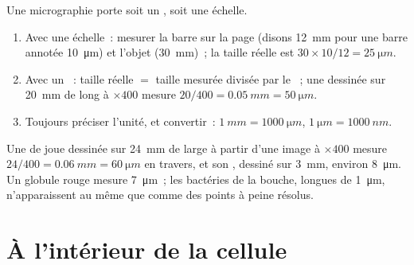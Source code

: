 \begin{method}\label{met:g10:cells-common-unit:measure}
Une micrographie porte soit un , soit une échelle.
\begin{enumerate}
  \item Avec une échelle~: mesurer la barre sur la page (disons
        \qty{12}{mm} pour une barre annotée \qty{10}{\micro m}) et
        l'objet (\qty{30}{mm})~; la taille réelle est $30 \times 10/12 =
        \qty{25}{\micro m}$.
  \item Avec un ~: taille réelle $=$ taille mesurée
        divisée par le ~; une  dessinée sur
        \qty{20}{mm} de long à
        $\times 400$ mesure $20/400 = \qty{0.05}{mm} = \qty{50}{\micro m}$.
  \item Toujours préciser l'unité, et convertir~: $\qty{1}{mm} =
        \qty{1000}{\micro m}$, $\qty{1}{\micro m} = \qty{1000}{nm}$.
\end{enumerate}
\end{method}

\begin{example}\label{ex:g10:cells-common-unit:cheek}
Une  de joue dessinée sur \qty{24}{mm} de large à partir d'une
image à $\times 400$ mesure
$24/400 = \qty{0.06}{mm} = \qty{60}{\micro m}$ en travers, et son
, dessiné sur \qty{3}{mm}, environ \qty{8}{\micro m}. Un globule
rouge mesure \qty{7}{\micro m}~; les bactéries de la bouche, longues de
\qty{1}{\micro m}, n'apparaissent au même  que comme des
points à peine résolus.
\end{example}

\section{À l'intérieur de la cellule}

